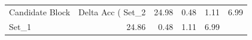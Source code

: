 \begin{tabular}{lrrrr}
\toprule
Candidate Block & Delta Acc (%
\midrule
Set_2 & 24.98 & 0.48 & 1.11 & 6.99 \\
Set_1 & 24.86 & 0.48 & 1.11 & 6.99 \\
\bottomrule
\end{tabular}
